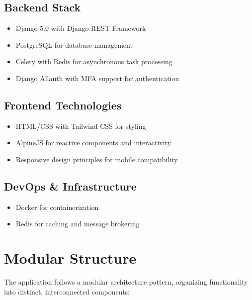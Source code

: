 \subsection{Backend Stack}
\begin{itemize}
    \item Django 5.0 with Django REST Framework
    \item PostgreSQL for database management
    \item Celery with Redis for asynchronous task processing
    \item Django Allauth with MFA support for authentication
\end{itemize}

\subsection{Frontend Technologies}
\begin{itemize}
    \item HTML/CSS with Tailwind CSS for styling
    \item AlpineJS for reactive components and interactivity
    \item Responsive design principles for mobile compatibility
\end{itemize}

\subsection{DevOps \& Infrastructure}
\begin{itemize}
    \item Docker for containerization
    \item Redis for caching and message brokering
\end{itemize}

\clearpage
\section{Modular Structure}

The application follows a modular architecture pattern, organizing functionality into distinct, interconnected components:

